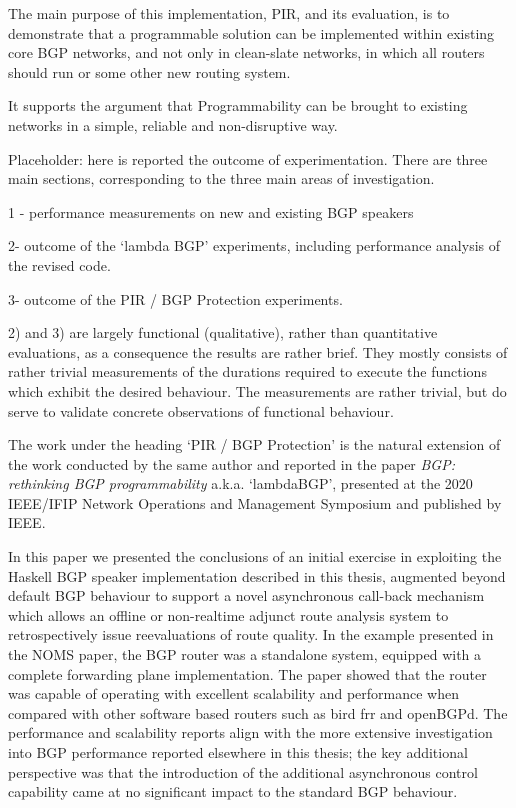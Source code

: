 The main purpose of this implementation, PIR,  and its evaluation, is to demonstrate that a programmable solution can be implemented within existing core BGP networks, and not only in clean-slate networks, in which all routers should run \hbgp or some other new routing system.

It supports the argument that Programmability can be brought to existing networks in a simple, reliable and non-disruptive way.

 {\color{blue}
  Placeholder: here is reported the outcome of experimentation.  There are three main sections, corresponding to the three main areas of investigation.

  1 - performance measurements on new and existing BGP speakers

  2- outcome of the `lambda BGP' experiments, including performance analysis of the revised code.

  3- outcome of the PIR / BGP Protection experiments.

  2) and 3) are largely functional (qualitative), rather than quantitative evaluations, as a consequence the results are rather brief.  They mostly consists of rather trivial measurements of the durations required to execute the functions which exhibit the desired behaviour.  The measurements are rather trivial, but do serve to validate concrete observations of functional behaviour. }

The work under the heading `PIR / BGP Protection' is the natural extension of the work conducted by the same author and reported in the paper
\textit{BGP: rethinking BGP programmability} \cite{lambdabgp} a.k.a. `lambdaBGP',
presented at the 2020 IEEE/IFIP Network Operations and Management Symposium and published by IEEE.

In this paper we presented the conclusions of an initial exercise in exploiting the Haskell BGP speaker implementation described in this thesis, augmented beyond default BGP behaviour to support a novel asynchronous call-back mechanism which allows an offline or non-realtime adjunct route analysis system to retrospectively issue reevaluations of route quality.  In the example presented in the NOMS paper, the BGP router was a standalone system, equipped with a complete forwarding plane implementation.   The paper showed that the router was capable of operating with excellent scalability and performance when compared with other software based routers such as bird frr and openBGPd.  The performance and scalability reports align with the more extensive investigation into BGP performance reported elsewhere in this thesis; the key additional perspective was that the introduction of the additional asynchronous control capability came at no significant impact to the standard BGP behaviour.

